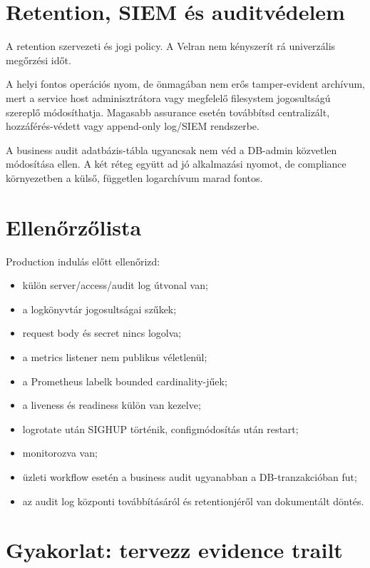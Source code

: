 \section{Retention, SIEM és auditvédelem}

A retention szervezeti és jogi policy. A Velran nem kényszerít rá univerzális megőrzési időt.

A helyi  fontos operációs nyom, de önmagában nem erős tamper-evident archívum, mert a service host adminisztrátora vagy megfelelő filesystem jogosultságú szereplő módosíthatja. Magasabb assurance esetén továbbítsd centralizált, hozzáférés-védett vagy append-only log/SIEM rendszerbe.

A business audit adatbázis-tábla ugyancsak nem véd a DB-admin közvetlen módosítása ellen. A két réteg együtt ad jó alkalmazási nyomot, de compliance környezetben a külső, független logarchívum marad fontos.

\section{Ellenőrzőlista}

Production indulás előtt ellenőrizd:

\begin{itemize}
  \item külön server/access/audit log útvonal van;
  \item a logkönyvtár jogosultságai szűkek;
  \item request body és secret nincs logolva;
  \item a metrics listener nem publikus véletlenül;
  \item a Prometheus labelk bounded cardinality-jűek;
  \item a liveness és readiness külön van kezelve;
  \item logrotate után SIGHUP történik, configmódosítás után restart;
  \item {} monitorozva van;
  \item üzleti workflow esetén a business audit ugyanabban a DB-tranzakcióban fut;
  \item az audit log központi továbbításáról és retentionjéről van dokumentált döntés.
\end{itemize}

\section{Gyakorlat: tervezz evidence trailt}
